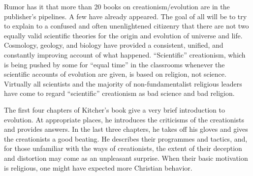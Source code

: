 \documentclass[a4paper]{article}
\begin{document}
\par
Rumor has it that more than 20 books on creationism/evolution are in the publisher’s pipelines. A few have already appeared. The goal of all will be to try to explain to a confused and often unenlightened citizenry that there are not two equally valid scientific theories for the origin and evolution of universe and life. Cosmology, geology, and biology have provided a consistent, unified, and constantly improving account of what happened. “Scientific” creationism, which is being pushed by some for “equal time” in the classrooms whenever the scientific accounts of evolution are given, is based on religion, not science. Virtually all scientists and the majority of non-fundamentalist religious leaders have come to regard “scientific” creationism as bad science and bad religion.

\par
The first four chapters of Kitcher’s book give a very brief introduction to evolution. At appropriate places, he introduces the criticisms of the creationists and provides answers. In the last three chapters, he takes off his gloves and gives the creationists a good beating. He describes their programmes and tactics, and, for those unfamiliar with the ways of creationists, the extent of their deception and distortion may come as an unpleasant surprise. When their basic motivation is religious, one might have expected more Christian behavior.
\end{document}
